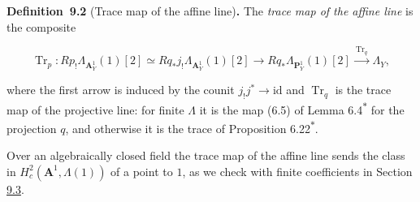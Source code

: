\documentclass[11pt]{article}
\newenvironment{bpstatement}[2]{\par\addvspace{0.6\baselineskip}\noindent\textbf{#1}#2\textbf{.}\enspace\ignorespaces}
  {\par\addvspace{0.4\baselineskip}}
\newcommand{\bpout}[1]{#1\textsuperscript{\hyperlink{bp-outside}{\ensuremath{\ast}}}}
\begin{document}
\label{bp7}%
\begin{bpstatement}{Definition~9.2}{ (Trace map of the affine line)}
The \emph{trace map of the affine line} is the composite

\[
\operatorname{Tr}_p:Rp_!\Lambda_{\mathbf A^1_Y}(1)[2]
\simeq Rq_*j_!\Lambda_{\mathbf A^1_Y}(1)[2]
\longrightarrow Rq_*\Lambda_{\mathbf P^1_Y}(1)[2]
\xrightarrow{\ \operatorname{Tr}_q\ }\Lambda_Y,
\tag{9.1}
\]

where the first arrow is induced by the counit \(j_!j^*\to\mathrm{id}\) and \(\operatorname{Tr}_q\) is the trace map of the projective line: for finite \(\Lambda\) it is the map (6.5) of Lemma \bpout{6.4} for the projection \(q\), and otherwise it is the trace of Proposition \bpout{6.22}.
\end{bpstatement}

\label{bp8}%
Over an algebraically closed field the trace map of the affine line sends the class in \(H^2_c(\mathbf A^1,\Lambda(1))\) of a point to \(1\), as we check with finite coefficients in Section \hyperref[bp15]{9.3}.
\end{document}
